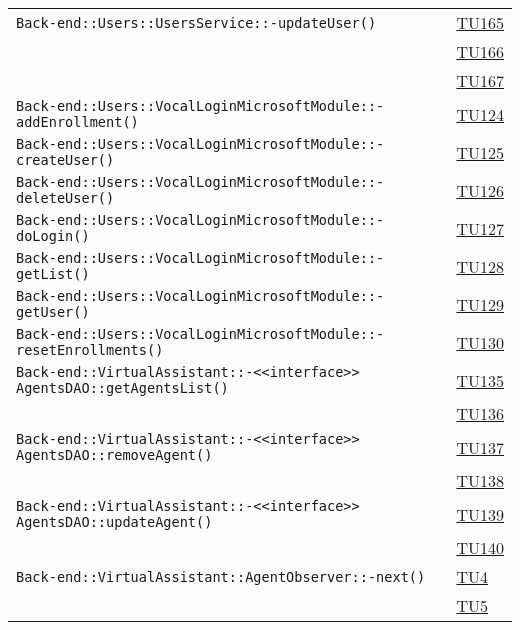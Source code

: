 \begin{longtable}{|>{\centering}m{12cm}|m{1cm}<{\centering}|}
\texttt{Back-end::Users::UsersService::-\linebreak updateUser()} & \hyperlink{TU165}{TU165}\\ & \hyperlink{TU166}{TU166}\\ & \hyperlink{TU167}{TU167}\\ \hline
\texttt{Back-end::Users::VocalLoginMicrosoftModule::-\linebreak addEnrollment()} & \hyperlink{TU124}{TU124}\\ \hline
\texttt{Back-end::Users::VocalLoginMicrosoftModule::-\linebreak createUser()} & \hyperlink{TU125}{TU125}\\ \hline
\texttt{Back-end::Users::VocalLoginMicrosoftModule::-\linebreak deleteUser()} & \hyperlink{TU126}{TU126}\\ \hline
\texttt{Back-end::Users::VocalLoginMicrosoftModule::-\linebreak doLogin()} & \hyperlink{TU127}{TU127}\\ \hline
\texttt{Back-end::Users::VocalLoginMicrosoftModule::-\linebreak getList()} & \hyperlink{TU128}{TU128}\\ \hline
\texttt{Back-end::Users::VocalLoginMicrosoftModule::-\linebreak getUser()} & \hyperlink{TU129}{TU129}\\ \hline
\texttt{Back-end::Users::VocalLoginMicrosoftModule::-\linebreak resetEnrollments()} & \hyperlink{TU130}{TU130}\\ \hline
\texttt{Back-end::VirtualAssistant::-\linebreak <<interface>> AgentsDAO::getAgentsList()} & \hyperlink{TU135}{TU135}\\ & \hyperlink{TU136}{TU136}\\ \hline
\texttt{Back-end::VirtualAssistant::-\linebreak <<interface>> AgentsDAO::removeAgent()} & \hyperlink{TU137}{TU137}\\ & \hyperlink{TU138}{TU138}\\ \hline
\texttt{Back-end::VirtualAssistant::-\linebreak <<interface>> AgentsDAO::updateAgent()} & \hyperlink{TU139}{TU139}\\ & \hyperlink{TU140}{TU140}\\ \hline
\texttt{Back-end::VirtualAssistant::AgentObserver::-\linebreak next()} & \hyperlink{TU4}{TU4}\\ & \hyperlink{TU5}{TU5}\\ \hline

\end{longtable}
